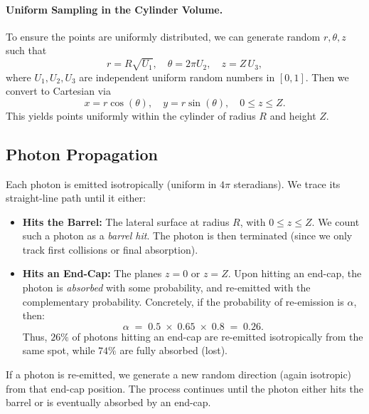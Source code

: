 \documentclass[11pt]{article}
\begin{document}
\paragraph{Uniform Sampling in the Cylinder Volume.}
To ensure the points are uniformly distributed, we can generate random $r,\theta,z$ such that
\[
  r = R \sqrt{U_1}, 
  \quad \theta = 2\pi U_2, 
  \quad z = Z \,U_3,
\]
where $U_1, U_2, U_3$ are independent uniform random numbers in $[0,1]$. Then we convert to Cartesian via
\[
  x = r\cos(\theta),\quad y = r\sin(\theta),\quad 0 \le z \le Z.
\]
This yields points uniformly within the cylinder of radius $R$ and height $Z$.

\subsection{Photon Propagation}
Each photon is emitted isotropically (uniform in $4\pi$ steradians). We trace its straight-line path until it either:
\begin{itemize}
  \item \textbf{Hits the Barrel:} The lateral surface at radius $R$, with $0 \le z \le Z$. We count such a photon as a \emph{barrel hit}. The photon is then terminated (since we only track first collisions or final absorption).
  \item \textbf{Hits an End-Cap:} The planes $z=0$ or $z=Z$. Upon hitting an end-cap, the photon is \emph{absorbed} with some probability, and re-emitted with the complementary probability. Concretely, if the probability of re-emission is $\alpha$, then:
  \begin{equation*}
    \alpha \;=\; 0.5 \;\times\; 0.65 \;\times\; 0.8 \;=\; 0.26.
  \end{equation*}
  Thus, $26\%$ of photons hitting an end-cap are re-emitted isotropically from the same spot, while $74\%$ are fully absorbed (lost).
\end{itemize}
If a photon is re-emitted, we generate a new random direction (again isotropic) from that end-cap position. The process continues until the photon either hits the barrel or is eventually absorbed by an end-cap.
\end{document}

